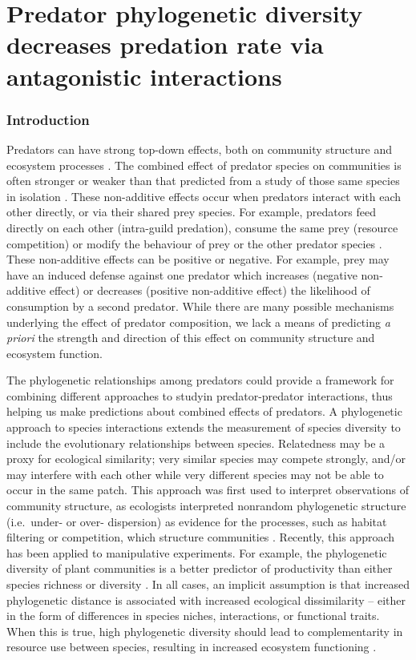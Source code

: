 \chapter{Predator phylogenetic diversity decreases predation rate via antagonistic interactions}
\label{chap:pd-ef}

\subsection{Introduction}\label{introduction}

Predators can have strong top-down effects, both on community structure
and ecosystem processes \citep{Estes2011}. The combined effect of
predator species on communities is often stronger or weaker than that
predicted from a study of those same species in isolation
\citep{Sih1998a, Ives2005}. These non-additive effects occur when
predators interact with each other directly, or via their shared prey
species. For example, predators feed directly on each other (intra-guild
predation), consume the same prey (resource competition) or modify the
behaviour of prey or the other predator species
\citep{Sih1998a, Griswold2006, Nystrom2001}. These non-additive effects
can be positive or negative. For example, prey may have an induced
defense against one predator which increases (negative non-additive
effect) or decreases (positive non-additive effect) the likelihood of
consumption by a second predator. While there are many possible
mechanisms underlying the effect of predator composition, we lack a
means of predicting \emph{a priori} the strength and direction of this
effect on community structure and ecosystem function.

The phylogenetic relationships among predators could provide a framework for combining different approaches to studyin predator-predator interactions, thus helping us make
predictions about combined effects of predators. A phylogenetic approach to species interactions
extends the measurement of species diversity to include the evolutionary
relationships between species. Relatedness may be a proxy for ecological similarity; very
similar species may compete strongly, and/or may interfere with each
other while very different species may not be able to occur in the same
patch. This approach was first used to interpret observations of
community structure, as ecologists interpreted nonrandom phylogenetic
structure (i.e.~under- or over- dispersion) as evidence for the
processes, such as habitat filtering or competition, which structure
communities \citep{Webb2002, Cavender-Bares2009}. Recently, this
approach has been applied to manipulative experiments. For example, the
phylogenetic diversity of plant communities is a better predictor of
productivity than either species richness or diversity
\citep[e.g.][]{Cadotte2009, Cadotte2008, Godoy2014}. In all cases, an
implicit assumption is that increased phylogenetic distance is
associated with increased ecological dissimilarity -- either in the form
of differences in species niches, interactions, or functional traits.
When this is true, high phylogenetic diversity should lead to
complementarity in resource use between species, resulting in increased
ecosystem functioning \citep{Srivastava2012c}. 

